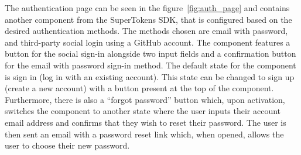 The authentication page can be seen in the figure~\ref{fig:auth_page} and contains another component from the SuperTokens SDK, that is configured based on the desired authentication methods. The methods chosen are email with password, and third-party social login using a GitHub account. The component features a button for the social sign-in alongside two input fields and a confirmation button for the email with password sign-in method. The default state for the component is sign in (log in with an existing account). This state can be changed to sign up (create a new account) with a button present at the top of the component. Furthermore, there is also a \enquote{forgot password} button which, upon activation, switches the component to another state where the user inputs their account email address and confirms that they wish to reset their password. The user is then sent an email with a password reset link which, when opened, allows the user to choose their new password.

